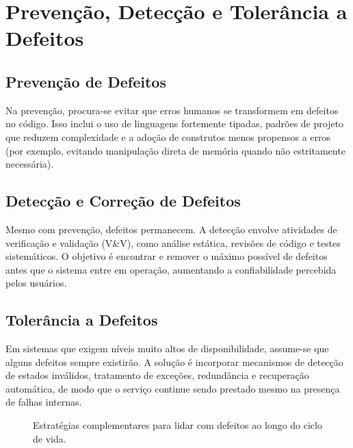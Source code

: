 \documentclass[12pt,a4paper]{report}
\begin{document}
\section{Prevenção, Detecção e Tolerância a Defeitos}

\subsection{Prevenção de Defeitos}

Na prevenção, procura-se evitar que erros humanos se transformem em defeitos
no código. Isso inclui o uso de linguagens fortemente tipadas, padrões de
projeto que reduzem complexidade e a adoção de construtos menos propensos a
erros (por exemplo, evitando manipulação direta de memória quando não
estritamente necessária).

\subsection{Detecção e Correção de Defeitos}

Mesmo com prevenção, defeitos permanecem. A detecção envolve atividades de
verificação e validação (V\&V), como análise estática, revisões de código e
testes sistemáticos. O objetivo é encontrar e remover o máximo possível de
defeitos antes que o sistema entre em operação, aumentando a
confiabilidade percebida pelos usuários.

\subsection{Tolerância a Defeitos}

Em sistemas que exigem níveis muito altos de disponibilidade, assume-se que
alguns defeitos sempre existirão. A solução é incorporar mecanismos de
detecção de estados inválidos, tratamento de exceções, redundância e
recuperação automática, de modo que o serviço continue sendo prestado mesmo
na presença de falhas internas.

\begin{figure}[h]
    \centering
    \caption{Estratégias complementares para lidar com defeitos ao longo do ciclo de vida.}
\end{figure}
\end{document}
